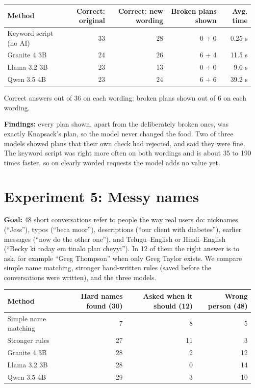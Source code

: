 \documentclass[11pt]{article}
\begin{document}
{\small
\begin{center}
\begin{tabular}{@{}lrrrr@{}}
\toprule
Method & Correct: original & Correct: new wording & Broken plans shown & Avg. time \\
\midrule
Keyword script (no AI) & 33 & 28 & 0 + 0 & 0.25 s \\
Granite 4 3B & 24 & 26 & 6 + 4 & 11.5 s \\
Llama 3.2 3B & 23 & 13 & 0 + 0 & 9.6 s \\
Qwen 3.5 4B & 23 & 24 & 6 + 6 & 39.2 s \\
\bottomrule
\end{tabular}

Correct answers out of 36 on each wording; broken plans shown out of 6 on each wording.
\end{center}}

\textbf{Findings:} every plan shown, apart from the deliberately broken ones, was
exactly Knapsack's plan, so the model never changed the food. Two of three models
showed plans that their own check had rejected, and said they were fine. The
keyword script was right more often on both wordings and is about 35 to 190 times
faster, so on clearly worded requests the model adds no value yet.

\section{Experiment 5: Messy names}

\textbf{Goal:} 48 short conversations refer to people the way real users do:
nicknames (``Jess''), typos (``beca moor''), descriptions (``our client with
diabetes''), earlier messages (``now do the other one''), and Telugu--English or
Hindi--English (``Becky ki today em tinalo plan cheyyi''). In 12 of them the right
answer is to ask, for example ``Greg Thompson'' when only Greg Taylor exists. We
compare simple name matching, stronger hand-written rules (saved before the
conversations were written), and the three models.

{\small
\begin{center}
\begin{tabular}{@{}lrrr@{}}
\toprule
Method & Hard names found (30) & Asked when it should (12) & Wrong person (48) \\
\midrule
Simple name matching & 7 & 8 & 5 \\
Stronger rules & 27 & 11 & 3 \\
Granite 4 3B & 28 & 2 & 12 \\
Llama 3.2 3B & 28 & 0 & 14 \\
Qwen 3.5 4B & 29 & 3 & 10 \\
\bottomrule
\end{tabular}
\end{center}}
\end{document}
